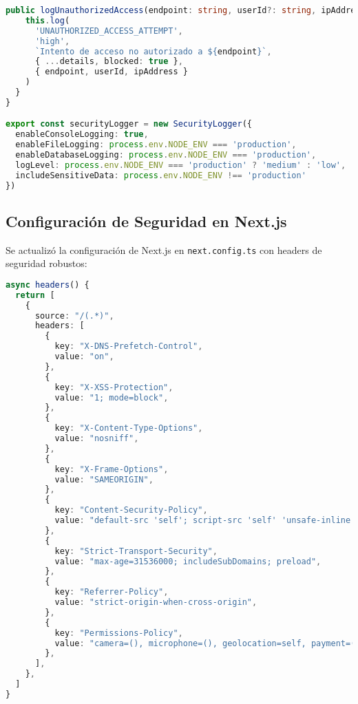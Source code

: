 \documentclass[12pt,a4paper]{article}
\begin{document}
\begin{lstlisting}[language=TypeScript, caption=Sistema de Logging de Seguridad]
  public logUnauthorizedAccess(endpoint: string, userId?: string, ipAddress?: string, details: Record<string, any> = {}): void {
    this.log(
      'UNAUTHORIZED_ACCESS_ATTEMPT',
      'high',
      `Intento de acceso no autorizado a ${endpoint}`,
      { ...details, blocked: true },
      { endpoint, userId, ipAddress }
    )
  }
}

export const securityLogger = new SecurityLogger({
  enableConsoleLogging: true,
  enableFileLogging: process.env.NODE_ENV === 'production',
  enableDatabaseLogging: process.env.NODE_ENV === 'production',
  logLevel: process.env.NODE_ENV === 'production' ? 'medium' : 'low',
  includeSensitiveData: process.env.NODE_ENV !== 'production'
})
\end{lstlisting}

\subsection{Configuración de Seguridad en Next.js}

Se actualizó la configuración de Next.js en \texttt{next.config.ts} con headers de seguridad robustos:

\begin{lstlisting}[language=TypeScript, caption=Configuración de Headers de Seguridad]
async headers() {
  return [
    {
      source: "/(.*)",
      headers: [
        {
          key: "X-DNS-Prefetch-Control",
          value: "on",
        },
        {
          key: "X-XSS-Protection",
          value: "1; mode=block",
        },
        {
          key: "X-Content-Type-Options",
          value: "nosniff",
        },
        {
          key: "X-Frame-Options",
          value: "SAMEORIGIN",
        },
        {
          key: "Content-Security-Policy",
          value: "default-src 'self'; script-src 'self' 'unsafe-inline'; style-src 'self' 'unsafe-inline' https://fonts.googleapis.com; font-src 'self' https://fonts.gstatic.com; img-src 'self' data: blob: https://* http://localhost:9000; media-src 'self' blob: https://*; connect-src 'self' https://* http://localhost:9000 ws://localhost:* wss://*; frame-ancestors 'none'; base-uri 'self'; form-action 'self';",
        },
        {
          key: "Strict-Transport-Security",
          value: "max-age=31536000; includeSubDomains; preload",
        },
        {
          key: "Referrer-Policy",
          value: "strict-origin-when-cross-origin",
        },
        {
          key: "Permissions-Policy",
          value: "camera=(), microphone=(), geolocation=self, payment=(), usb=(), magnetometer=(), accelerometer=(), gyroscope=()",
        },
      ],
    },
  ]
}
\end{lstlisting}
\end{document}
